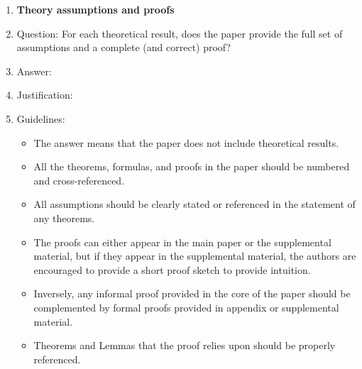 \documentclass{article}
\begin{document}
\begin{enumerate}
\item {\bf Theory assumptions and proofs}
    \item[] Question: For each theoretical result, does the paper provide the full set of assumptions and a complete (and correct) proof?
    \item[] Answer: \answerTODO{} %
    \item[] Justification: \justificationTODO{}
    \item[] Guidelines:
    \begin{itemize}
        \item The answer \answerNA{} means that the paper does not include theoretical results. 
        \item All the theorems, formulas, and proofs in the paper should be numbered and cross-referenced.
        \item All assumptions should be clearly stated or referenced in the statement of any theorems.
        \item The proofs can either appear in the main paper or the supplemental material, but if they appear in the supplemental material, the authors are encouraged to provide a short proof sketch to provide intuition. 
        \item Inversely, any informal proof provided in the core of the paper should be complemented by formal proofs provided in appendix or supplemental material.
        \item Theorems and Lemmas that the proof relies upon should be properly referenced. 
    \end{itemize}


\end{enumerate}
\end{document}
